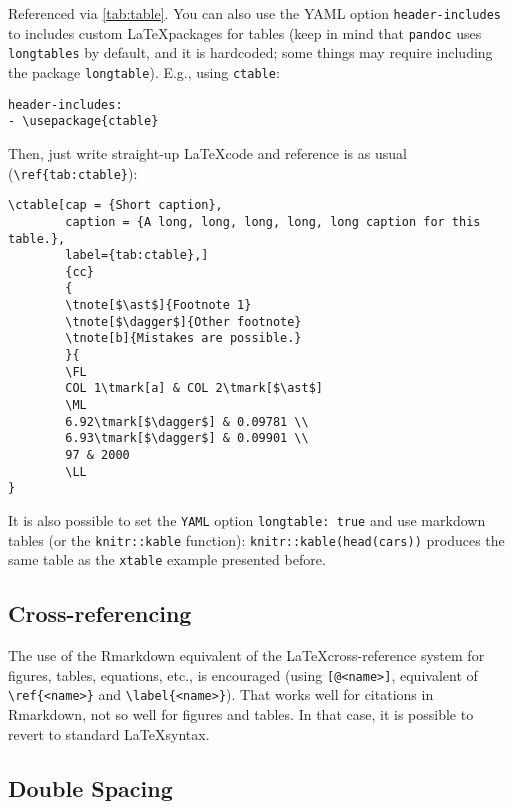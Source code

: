 \documentclass[AMA,STIX1COL,]{WileyNJD-v2}
\begin{document}
Referenced via \ref{tab:table}. You can also use the YAML option
\texttt{header-includes} to includes custom \LaTeX packages for tables
(keep in mind that \texttt{pandoc} uses \texttt{longtables} by default,
and it is hardcoded; some things may require including the package
\texttt{longtable}). E.g., using \texttt{ctable}:

\begin{verbatim}
header-includes:
- \usepackage{ctable}
\end{verbatim}

Then, just write straight-up \LaTeX code and reference is as usual
(\texttt{\textbackslash{}ref\{tab:ctable\}}):

\begin{verbatim}
\ctable[cap = {Short caption},
        caption = {A long, long, long, long, long caption for this table.},
        label={tab:ctable},]
        {cc}
        {
        \tnote[$\ast$]{Footnote 1}
        \tnote[$\dagger$]{Other footnote}
        \tnote[b]{Mistakes are possible.}
        }{
        \FL
        COL 1\tmark[a] & COL 2\tmark[$\ast$]
        \ML
        6.92\tmark[$\dagger$] & 0.09781 \\
        6.93\tmark[$\dagger$] & 0.09901 \\
        97 & 2000
        \LL
}
\end{verbatim}

It is also possible to set the \texttt{YAML} option
\texttt{longtable:\ true} and use markdown tables (or the
\texttt{knitr::kable} function): \texttt{knitr::kable(head(cars))}
produces the same table as the \texttt{xtable} example presented before.

\subsection{Cross-referencing}\label{cross-referencing}

The use of the Rmarkdown equivalent of the \LaTeX cross-reference system
for figures, tables, equations, etc., is encouraged (using
\texttt{{[}@\textless{}name\textgreater{}{]}}, equivalent of
\texttt{\textbackslash{}ref\{\textless{}name\textgreater{}\}} and
\texttt{\textbackslash{}label\{\textless{}name\textgreater{}\}}). That
works well for citations in Rmarkdown, not so well for figures and
tables. In that case, it is possible to revert to standard
\LaTeX syntax.

\subsection{Double Spacing}\label{double-spacing}
\end{document}
